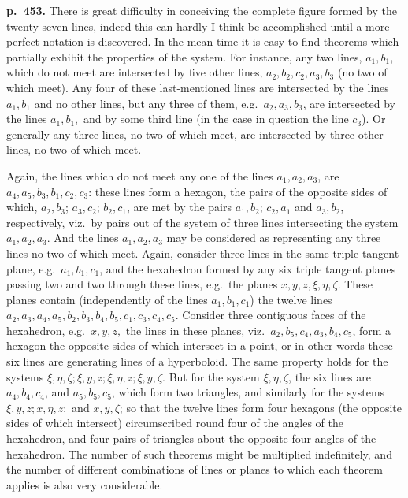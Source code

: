 \documentclass[11pt]{article}
\begin{document}
\bigskip
\noindent\textbf{p.~453.} There is great difficulty in conceiving the complete figure formed by the twenty-seven lines, indeed this can hardly I think be accomplished until a more perfect notation is discovered. In the mean time it is easy to find theorems which partially exhibit the properties of the system. For instance, any two lines, $a_1, b_1$, which do not meet are intersected by five other lines, $a_2, b_2, c_2, a_3, b_3$ (no two of which meet). Any four of these last-mentioned lines are intersected by the lines $a_1, b_1$ and no other lines, but any three of them, e.g.\ $a_2, a_3, b_3$, are intersected by the lines $a_1, b_1,$ and by some third line (in the case in question the line $c_3$). Or generally any three lines, no two of which meet, are intersected by three other lines, no two of which meet.

Again, the lines which do not meet any one of the lines $a_1, a_2, a_3$, are $a_4, a_5, b_3, b_1, c_2, c_3$: these lines form a hexagon, the pairs of the opposite sides of which, $a_2, b_3$; $a_3, c_2$; $b_2, c_1$, are met by the pairs $a_1, b_2$; $c_2, a_1$ and $a_3, b_2$, respectively, viz.\ by pairs out of the system of three lines intersecting the system $a_1, a_2, a_3$. And the lines $a_1, a_2, a_3$ may be considered as representing any three lines no two of which meet. Again, consider three lines in the same triple tangent plane, e.g.\ $a_1, b_1, c_1$, and the hexahedron formed by any six triple tangent planes passing two and two through these lines, e.g.\ the planes $x, y, z, \xi, \eta, \zeta$. These planes contain (independently of the lines $a_1, b_1, c_1$) the twelve lines $a_2, a_3, a_4, a_5, b_2, b_3, b_4, b_5, c_1, c_3, c_4, c_5$. Consider three contiguous faces of the hexahedron, e.g.\ $x, y, z,$ the lines in these planes, viz.\ $a_2, b_5, c_4, a_3, b_4, c_5$, form a hexagon the opposite sides of which intersect in a point, or in other words these six lines are generating lines of a hyperboloid. The same property holds for the systems $\xi, \eta, \zeta; \xi, y, z; \xi, \eta, z; \xi, y, \zeta$. But for the system $\xi, \eta, \zeta$, the six lines are $a_4, b_4, c_4$, and $a_5, b_5, c_5$, which form two triangles, and similarly for the systems $\xi, y, z; x, \eta, z;$ and $x, y, \zeta$; so that the twelve lines form four hexagons (the opposite sides of which intersect) circumscribed round four of the angles of the hexahedron, and four pairs of triangles about the opposite four angles of the hexahedron. The number of such theorems might be multiplied indefinitely, and the number of different combinations of lines or planes to which each theorem applies is also very considerable.
\end{document}
